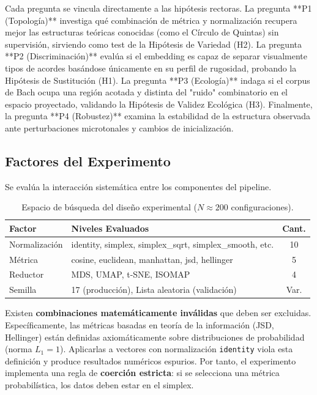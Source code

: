 Cada pregunta se vincula directamente a las hipótesis rectoras. La pregunta **P1 (Topología)** investiga qué combinación de métrica y normalización recupera mejor las estructuras teóricas conocidas (como el Círculo de Quintas) sin supervisión, sirviendo como test de la Hipótesis de Variedad (H2). La pregunta **P2 (Discriminación)** evalúa si el embedding es capaz de separar visualmente tipos de acordes basándose únicamente en su perfil de rugosidad, probando la Hipótesis de Sustitución (H1). La pregunta **P3 (Ecología)** indaga si el corpus de Bach ocupa una región acotada y distinta del "ruido" combinatorio en el espacio proyectado, validando la Hipótesis de Validez Ecológica (H3). Finalmente, la pregunta **P4 (Robustez)** examina la estabilidad de la estructura observada ante perturbaciones microtonales y cambios de inicialización.

\subsection{Factores del Experimento}

Se evalúa la interacción sistemática entre los componentes del pipeline.

\begin{table}[h]
\centering
\begin{tabular}{|l|p{8cm}|c|}
\hline
\textbf{Factor} & \textbf{Niveles Evaluados} & \textbf{Cant.} \\ \hline
Normalización & identity, simplex, simplex\_sqrt, simplex\_smooth, etc. & 10 \\ \hline
Métrica & cosine, euclidean, manhattan, jsd, hellinger & 5 \\ \hline
Reductor & MDS, UMAP, t-SNE, ISOMAP & 4 \\ \hline
Semilla & 17 (producción), Lista aleatoria (validación) & Var. \\ \hline
\end{tabular}
\caption{Espacio de búsqueda del diseño experimental ($N \approx 200$ configuraciones).}
\label{tab:factores_experimentales}
\end{table}

Existen \textbf{combinaciones matemáticamente inválidas} que deben ser excluidas. Específicamente, las métricas basadas en teoría de la información (JSD, Hellinger) están definidas axiomáticamente sobre distribuciones de probabilidad (norma $L_1=1$). Aplicarlas a vectores con normalización \texttt{identity} viola esta definición y produce resultados numéricos espurios. Por tanto, el experimento implementa una regla de \textbf{coerción estricta}: si se selecciona una métrica probabilística, los datos deben estar en el simplex.

